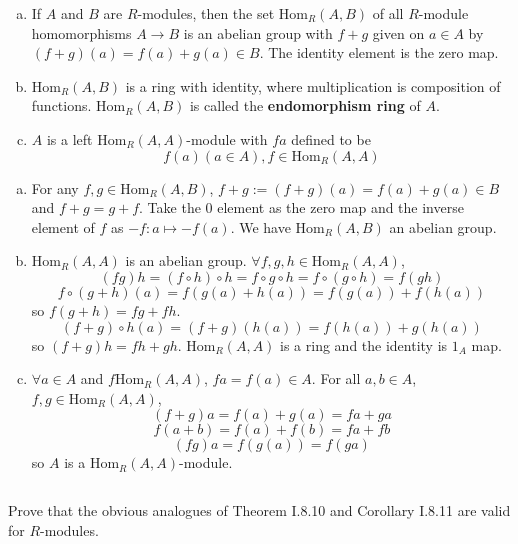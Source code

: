 \begin{ex}
    \begin{enumerate}[(a)]
        \item If $A$ and $B$ are $R$-modules, then the set $\mathrm{Hom}_{R}(A,B)$ of all $R$-module homomorphisms $A\to B$ is an abelian group with $f+g$ given on $a\in A$ by $(f+g)(a)=f(a)+g(a)\in B$. The identity element is the zero map.
        \item $\mathrm{Hom}_{R}(A,B)$ is a ring with identity, where multiplication is composition of functions. $\mathrm{Hom}_{R}(A,B)$ is called the \textbf{endomorphism ring} of $A$.
        \item $A$ is a left $\mathrm{Hom}_{R}(A,A)$-module with $fa$ defined to be \[f(a)(a\in A), f\in \mathrm{Hom}_{R}(A,A)\]
    \end{enumerate}
\end{ex}

\begin{answer}
    \begin{enumerate}[(a)]
        \item For any $f,g\in \mathrm{Hom}_{R}(A,B)$, $f+g:=(f+g)(a)=f(a)+g(a)\in B$ and $f+g=g+f$. Take the 0 element as the zero map and the inverse element of $f$ as $-f:a\mapsto -f(a)$. We have $\mathrm{Hom}_{R}(A,B)$ an abelian group.
        \item $\mathrm{Hom}_{R}(A,A)$ is an abelian group. $\forall f,g,h\in \mathrm{Hom}_{R}(A,A)$, \[(fg)h=(f\circ h)\circ h=f\circ g\circ h=f\circ(g\circ h)=f(gh)\]
        \[f\circ(g+h)(a)=f(g(a)+h(a))=f(g(a))+f(h(a))\]
        so $f(g+h)=fg+fh$.
        \[(f+g)\circ h(a)=(f+g)(h(a))=f(h(a))+g(h(a))\]
        so $(f+g)h=fh+gh$. $\mathrm{Hom}_{R}(A,A)$ is a ring and the identity is $1_{A}$ map.
        \item $\forall a\in A$ and $f\mathrm{Hom}_{R}(A,A)$, $fa=f(a)\in A$. For all $a,b\in A$, $f,g\in\mathrm{Hom}_{R}(A,A)$,\[(f+g)a=f(a)+g(a)=fa+ga\]\[f(a+b)=f(a)+f(b)=fa+fb\]\[(fg)a=f(g(a))=f(ga)\]so $A$ is a $\mathrm{Hom}_{R}(A,A)$-module. 
    \end{enumerate}
\end{answer}

$$ $$

\begin{ex}
    Prove that the obvious analogues of Theorem I.8.10 and Corollary I.8.11 are valid for $R$-modules.
\end{ex}

